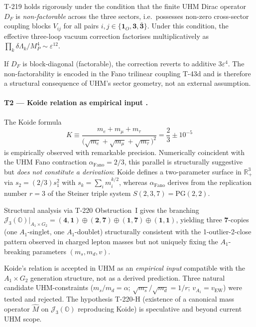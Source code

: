 \begin{closurebox}
T-219 holds rigorously under the condition that the finite UHM Dirac operator
$D_F$ is \emph{non-factorable} across the three sectors, i.e.\ possesses
non-zero cross-sector coupling blocks $V_{ij}$ for all pairs
$i, j \in \{\mathbf 1_O, \mathbf 3, \bar{\mathbf 3}\}$. Under this condition,
the effective three-loop vacuum correction factorises multiplicatively as
$\prod_k \delta\Lambda_k / M_P^4 \sim \varepsilon^{12}$.

If $D_F$ is block-diagonal (factorable), the correction reverts to additive
$3\varepsilon^4$. The non-factorability is encoded in the Fano trilinear coupling
T-43d and is therefore a structural consequence of UHM's sector geometry,
not an external assumption.
\end{closurebox}

\paragraph{T2 --- Koide relation as empirical input .}
The Koide formula
\[
K \equiv \frac{m_e + m_\mu + m_\tau}{\bigl(\sqrt{m_e} + \sqrt{m_\mu} + \sqrt{m_\tau}\bigr)^2}
= \frac{2}{3} \pm 10^{-5}
\]
is empirically observed with remarkable precision. Numerically coincident with the
UHM Fano contraction $\alpha_{\mathrm{Fano}} = 2/3$, this parallel is
structurally suggestive but \emph{does not constitute a derivation}: Koide
defines a two-parameter surface in $\mathbb R^3_+$ via
$s_2 = (2/3) s_1^2$ with $s_k = \sum_i m_i^{k/2}$, whereas $\alpha_{\mathrm{Fano}}$
derives from the replication number $r = 3$ of the Steiner triple system
$S(2,3,7) = \mathrm{PG}(2,2)$.

Structural analysis via T-220 Obstruction~I gives the branching
$\mathcal J_3(\mathbb O)|_{A_1 \times G_2} = (\mathbf 4, \mathbf 1) \oplus
(\mathbf 2, \mathbf 7) \oplus (\mathbf 1, \mathbf 7) \oplus (\mathbf 1, \mathbf 1)$,
yielding three $\mathbf 7$-copies (one $A_1$-singlet, one $A_1$-doublet) structurally
consistent with the 1-outlier-2-close pattern observed in charged lepton masses
but not uniquely fixing the $A_1$-breaking parameters $(m_s, m_d, v)$.

\begin{closurebox}
Koide's relation is accepted in UHM as an \emph{empirical input} compatible with
the $A_1 \times G_2$ generation structure, not as a derived prediction. Three
natural candidate UHM-constraints ($m_s/m_d = \alpha$; $\sqrt{m_s}/\sqrt{m_d} = 1/r$;
$v_{A_1} = v_{\mathrm{EW}}$) were tested and rejected. The hypothesis T-220-H
(existence of a canonical mass operator $\hat M$ on $\mathcal J_3(\mathbb O)$
reproducing Koide) is speculative and beyond current UHM scope.
\end{closurebox}

